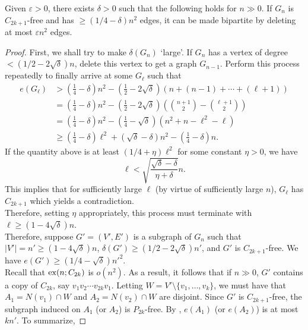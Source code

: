 			\begin{flem}
				\label{lemma: exx n C 2k+1 stability}
				Given $\varepsilon > 0$, there exists $\delta > 0$ such that the following holds for $n\gg 0$. If $G_n$ is $C_{2k+1}$-free and has $\ge (1/4 - \delta)n^2$ edges, it can be made bipartite by deleting at most $\varepsilon n^2$ edges.
			\end{flem}
			\begin{proof}
				First, we shall try to make $\delta(G_n)$ `large'. If $G_n$ has a vertex of degree $<(1/2 - 2\sqrt{\delta})n$, delete this vertex to get a graph $G_{n-1}$. Perform this process repeatedly to finally arrive at some $G_\ell$ such that
				\begin{align*}
					e(G_\ell) &> \left(\frac{1}{4} - \delta\right)n^2  - \left( \frac{1}{2} - 2\sqrt{\delta} \right) \left( n + (n-1) + \cdots + (\ell+1) \right) \\
					&= \left(\frac{1}{4} - \delta\right)n^2  - \left( \frac{1}{2} - 2\sqrt{\delta} \right) \left( \binom{n+1}{2} - \binom{\ell+1}{2} \right) \\
					&= \left( \frac{1}{4} - \delta \right)n^2 - \left( \frac{1}{4} - \sqrt{\delta} \right)\left( n^2 + n - \ell^2 - \ell \right) \\
					&\ge \left( \frac{1}{4} - \delta \right) \ell^2 + (\sqrt{\delta}-\delta) n^2 - \left( \frac{1}{4} - \delta \right)n.
				\end{align*}
				If the quantity above is at least $\left( 1/4 + \eta \right) \ell^2$ for some constant $\eta > 0$, we have
				\[ \ell < \sqrt{ \frac{\sqrt{\delta}-\delta}{\eta+\delta} } n. \]
				This implies that for sufficiently large $\ell$ (by virtue of sufficiently large $n$), $G_\ell$ has $C_{2k+1}$ which yields a contradiction.\\
				Therefore, setting $\eta$ appropriately, this process must terminate with $\ell \ge (1-4\sqrt{\delta}) n$.\\
				Therefore, suppose $G' = (V',E')$ is a subgraph of $G_n$ such that $|V'| = n' \ge (1-4\sqrt{\delta}) n$, $\delta(G') \ge (1/2 - 2\sqrt{\delta}) n'$, and $G'$ is $C_{2k+1}$-free. We have $e(G') \ge (1/4 - \sqrt{\delta})n'^2$.\\
				Recall that $\operatorname{ex}(n;C_{2k})$ is $o(n^2)$. As a result, it follows that if $n\gg 0$, $G'$ contains a copy of $C_{2k}$, say $v_1 v_2 \cdots v_{2k} v_1$. Letting $W = V' \setminus \{v_1,\ldots,v_k\}$, we must have that $A_1 = N(v_1) \cap W$ and $A_2 = N(v_2) \cap W$ are disjoint. Since $G'$ is $C_{2k+1}$-free, the subgraph induced on $A_1$ (or $A_2$) is $P_{2k}$-free. By , $e(A_1)$ (or $e(A_2)$) is at most $kn'$. To summarize,

\end{proof}
